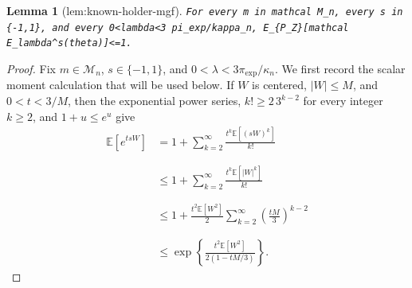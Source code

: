 \documentclass{article}
\newtheorem{lemma}{Lemma}
\begin{document}
\begin{lemma}[lem:known-holder-mgf]\label{lem:known-holder-mgf}
\texttt{For every m in mathcal M\_n, every s in \{-1,1\}, and every 0<lambda<3 pi\_exp/kappa\_n, E\_\{P\_Z\}[mathcal E\_lambda\textasciicircum{}s(theta)]<=1.}
\end{lemma}
\begin{proof}
Fix \(m\in\mathcal M_n\), \(s\in\{-1,1\}\), and \(0<\lambda<3\pi_{\exp}/\kappa_n\). We first record the scalar moment calculation that will be used below. If \(W\) is centered, \(|W|\le M\), and \(0<t<3/M\), then the exponential power series, \(k!\ge 2\,3^{k-2}\) for every integer \(k\ge2\), and \(1+u\le e^u\) give
\[
\begin{aligned}
\mathbb E[e^{tsW}]
&=1+\sum_{k=2}^{\infty}\frac{t^k\mathbb E[(sW)^k]}{k!}\\\\\\
&\le 1+\sum_{k=2}^{\infty}\frac{t^k\mathbb E[|W|^k]}{k!}\\\\\\
&\le 1+\frac{t^2\mathbb E[W^2]}2
\sum_{k=2}^{\infty}\left(\frac{tM}{3}\right)^{k-2}\\\\\\
&\le \exp\left\{\frac{t^2\mathbb E[W^2]}{2(1-tM/3)}\right\}.
\end{aligned}
\]


\end{proof}
\end{document}

